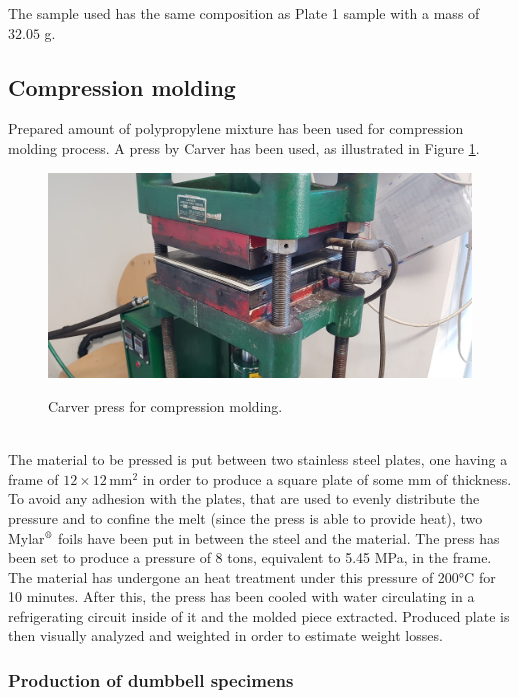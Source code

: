 \documentclass[a4paper, 11pt]{article}
\begin{document}
The sample used has the same composition as Plate 1 sample with a mass of $32.05$ g.

\subsection{Compression molding}

Prepared amount of polypropylene mixture has been used for compression molding process. A press by Carver has been used, as illustrated in Figure \ref{fig:press}. 
\begin{figure}[htp]
	\centering
	\includegraphics[scale=0.2]
	{PHOTO-2019-05-23-17-38-03.jpg}
	\label{fig:press}
	\caption{Carver press for compression molding.}
\end{figure}\\
The material to be pressed is put between two stainless steel plates, one having a frame of $12\times 12\, \text{mm}^2$ in order to produce a square plate of some mm of thickness. To avoid any adhesion with the plates, that are used to evenly distribute the pressure and to confine the melt (since the press is able to provide heat), two Mylar${^\text{\textregistered}}$ foils have been put in between the steel and the material. The press has been set to produce a pressure of 8 tons, equivalent to 5.45 MPa, in the frame. The material has undergone an heat treatment under this pressure of 200°C for 10 minutes. After this, the press has been cooled with water circulating in a refrigerating circuit inside of it and the molded piece extracted. Produced plate is then visually analyzed and weighted in order to estimate weight losses. \par 

\subsubsection{Production of dumbbell specimens}
\end{document}
